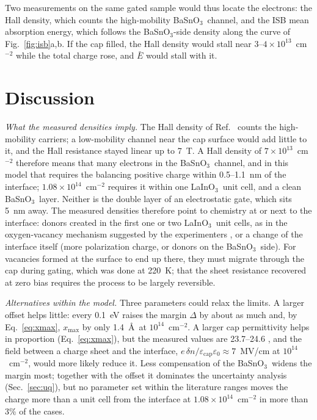 \documentclass[11pt]{article}
\newcommand{\LIO}{\texorpdfstring{LaInO$_3$}{LaInO3}}
\newcommand{\BSO}{\texorpdfstring{BaSnO$_3$}{BaSnO3}}
\newcommand{\xmax}{x_\mathrm{max}}
\begin{document}
Two measurements on the same gated sample would thus locate the electrons: the Hall density, which counts the high-mobility \BSO\ channel, and the ISB mean absorption energy, which follows the \BSO-side density along the curve of Fig.~\ref{fig:isb}a,b. If the cap filled, the Hall density would stall near $3$--$4\times10^{13}$~cm$^{-2}$ while the total charge rose, and $\bar E$ would stall with it.

\section{Discussion}\label{sec:disc}
\emph{What the measured densities imply.} The Hall density of Ref.~\cite{Lee2024LIO} counts the high-mobility carriers; a low-mobility channel near the cap surface would add little to it, and the Hall resistance stayed linear up to 7~T. A Hall density of $7\times10^{13}$~cm$^{-2}$ therefore means that many electrons in the \BSO\ channel, and in this model that requires the balancing positive charge within 0.5--1.1~nm of the interface; $1.08\times10^{14}$~cm$^{-2}$ requires it within one \LIO\ unit cell, and a clean \BSO\ layer. Neither is the double layer of an electrostatic gate, which sits 5~nm away. The measured densities therefore point to chemistry at or next to the interface: donors created in the first one or two \LIO\ unit cells, as in the oxygen-vacancy mechanism suggested by the experimenters \cite{Lee2024LIO}, or a change of the interface itself (more polarization charge, or donors on the \BSO\ side). For vacancies formed at the surface to end up there, they must migrate through the cap during gating, which was done at 220~K; that the sheet resistance recovered at zero bias requires the process to be largely reversible.

\emph{Alternatives within the model.} Three parameters could relax the limits. A larger offset helps little: every 0.1~eV raises the margin $\Delta$ by about as much and, by Eq.~\eqref{eq:xmax}, $\xmax$ by only 1.4~\AA\ at $10^{14}$~cm$^{-2}$. A larger cap permittivity helps in proportion (Eq.~\ref{eq:xmax}), but the measured values are 23.7--24.6 \cite{Jang2017LIO,Galazka2021}, and the field between a charge sheet and the interface, $e\,\delta n/\varepsilon_\mathrm{cap}\varepsilon_0\approx7$~MV/cm at $10^{14}$~cm$^{-2}$, would more likely reduce it. Less compensation of the \BSO\ widens the margin most; together with the offset it dominates the uncertainty analysis (Sec.~\ref{sec:uq}), but no parameter set within the literature ranges moves the charge more than a unit cell from the interface at $1.08\times10^{14}$~cm$^{-2}$ in more than 3\% of the cases.
\end{document}
